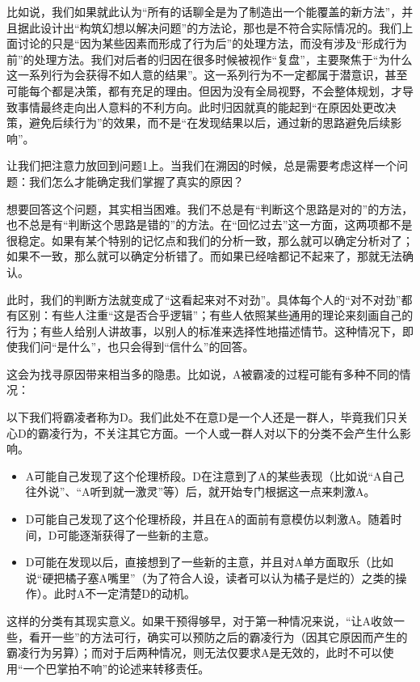 比如说，我们如果就此认为“所有的话聊全是为了制造出一个能覆盖的新方法”，并且据此设计出“构筑幻想以解决问题”的方法论，那也是不符合实际情况的。我们上面讨论的只是“因为某些因素而形成了行为后”的处理方法，而没有涉及“形成行为前”的处理方法。我们对后者的归因在很多时候被视作“复盘”，主要聚焦于“为什么这一系列行为会获得不如人意的结果”。这一系列行为不一定都属于潜意识，甚至可能每个都是决策，都有充足的理由。但因为没有全局视野，不会整体规划，才导致事情最终走向出人意料的不利方向。此时归因就真的能起到“在原因处更改决策，避免后续行为”的效果，而不是“在发现结果以后，通过新的思路避免后续影响”。


\divider

让我们把注意力放回到问题1上。当我们在溯因的时候，总是需要考虑这样一个问题：我们怎么才能确定我们掌握了真实的原因？

想要回答这个问题，其实相当困难。我们不总是有“判断这个思路是对的”的方法，也不总是有“判断这个思路是错的”的方法。在“回忆过去”这一方面，这两项都不是很稳定。如果有某个特别的记忆点和我们的分析一致，那么就可以确定分析对了；如果不一致，那么就可以确定分析错了。而如果已经啥都记不起来了，那就无法确认。

此时，我们的判断方法就变成了“这看起来对不对劲”。具体每个人的“对不对劲”都有区别：有些人注重“这是否合乎逻辑”；有些人依照某些通用的理论来刻画自己的行为；有些人给别人讲故事，以别人的标准来选择性地描述情节。这种情况下，即使我们问“是什么”，也只会得到“信什么”的回答。

这会为找寻原因带来相当多的隐患。比如说，A被霸凌的过程可能有多种不同的情况：
\begin{explain}
以下我们将霸凌者称为D。我们此处不在意D是一个人还是一群人，毕竟我们只关心D的霸凌行为，不关注其它方面。一个人或一群人对以下的分类不会产生什么影响。
\begin{itemize}
\item A可能自己发现了这个伦理桥段。D在注意到了A的某些表现（比如说“A自己往外说”、“A听到就一激灵”等）后，就开始专门根据这一点来刺激A。
\item D可能自己发现了这个伦理桥段，并且在A的面前有意模仿以刺激A。随着时间，D可能逐渐获得了一些新的主意。
\item D可能在发现以后，直接想到了一些新的主意，并且对A单方面取乐（比如说“硬把橘子塞A嘴里”（为了符合人设，读者可以认为橘子是烂的）之类的操作）。此时A不一定清楚D的动机。
\end{itemize}
\end{explain}
这样的分类有其现实意义。如果干预得够早，对于第一种情况来说，“让A收敛一些，看开一些”的方法可行，确实可以预防之后的霸凌行为（因其它原因而产生的霸凌行为另算）；而对于后两种情况，则无法仅要求A是无效的，此时不可以使用“一个巴掌拍不响”的论述来转移责任。

